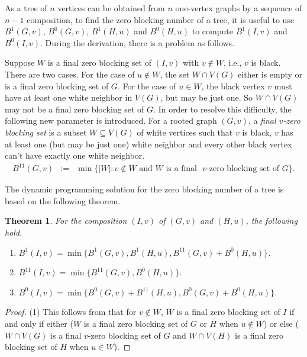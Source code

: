 \documentclass[preprint,12pt]{elsarticle}
\newtheorem{theorem}{Theorem}
\begin{document}
{As a tree of $n$ vertices can be obtained from $n$ one-vertex graphs by a sequence of $n-1$ composition, to find the zero blocking  number of a tree,
it is useful to use $B^1(G,v)$, $B^0(G,v)$, $B^1(H,u)$ and $B^0(H,u)$ to compute $B^1(I,v)$ and $B^0(I,v)$.
During the derivation, there is a problem as follows.

Suppose $W$ is a {final} zero blocking set of $(I,v)$ with $v \notin W$, i.e., $v$ is black.
There are two cases.
For the case of $u \notin W$, the set $W\cap V(G)$ either is empty or is a {final} zero blocking set of $G$.
For the case of $u\in W$, the black vertex $v$ must have at least one white neighbor in $V(G)$, but may be just one.
So $W\cap V(G)$ may not be a {final} zero blocking set of $G$.
In order to resolve this difficulty, the following new parameter is introduced.
For a rooted graph $(G,v)$, a {\em {final} $v$-zero blocking set} is a subset $W\subseteq V(G)$ of white vertices such that $v$ is black, $v$ has at least one (but may be just one) white neighbor and every other black vertex can't have exactly one white neighbor.
%
\begin{eqnarray*}
 B^{11}(G,v) &:=& \min\{|W|: \mbox{$v\notin W$ and $W$ is a {final} $v$-zero blocking set of $G$} \}.
\end{eqnarray*}

The dynamic programming solution for the zero blocking number of a tree is based on the following theorem.

\begin{theorem} \label{zbs2}
For the composition $(I,v)$ of $(G,v)$ and $(H,u)$, the following hold.
\begin{enumerate}
\item[$(1)$] $B^1(I,v) = \min\{B^1(G,v), B^1(H,u), B^{11}(G,v) + B^0(H,u)\}$.
\item[$(2)$] $B^{11}(I,v)  = \min\{B^{11}(G,v), B^0(H,u)\}$.
\item[$(3)$] $B^0(I,v) = \min\{B^0(G,v) + B^{11}(H,u), B^0(G,v) + B^0(H,u)\}$.
\end{enumerate}
\end{theorem}
\begin{proof}
(1) This follows from that for $v\notin W$, $W$ is a {final} zero blocking set of $I$
if and only if either ($W$ is a {final} zero blocking set of $G$ or $H$ when $u\notin W$)
or else ($W\cap V(G)$ is a {final} $v$-zero blocking set of $G$ and $W\cap V(H)$ is a {final} zero blocking set of $H$ when $u\in W$).


\end{proof}}
\end{document}

